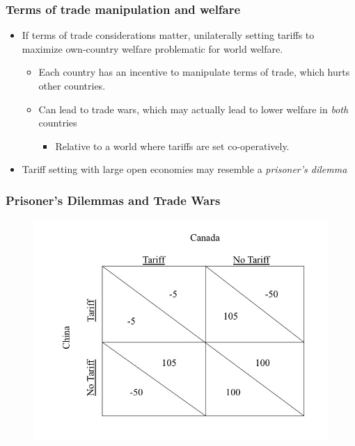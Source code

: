 \documentclass{beamer}
\begin{document}
\begin{frame}
	\frametitle{Terms of trade manipulation and welfare}
	\begin{itemize}
		\item If terms of trade considerations matter, unilaterally setting tariffs to maximize own-country welfare problematic for world welfare.
			\begin{itemize}
				\item Each country has an incentive to manipulate terms of trade, which hurts other countries.
				\item Can lead to trade wars, which may actually lead to lower welfare in \emph{both} countries
					\begin{itemize}
						\item Relative to a world where tariffs are set co-operatively. 
					\end{itemize}
			\end{itemize}
		\item Tariff setting with large open economies may resemble a \emph{prisoner's dilemma}
	\end{itemize}
\end{frame}

\begin{frame}
	\frametitle{Prisoner's Dilemmas and Trade Wars}
\begin{figure}
	\begin{center}
		\includegraphics[scale=0.35]{slide120}
	\end{center}
\end{figure}
\end{frame}
\end{document}
